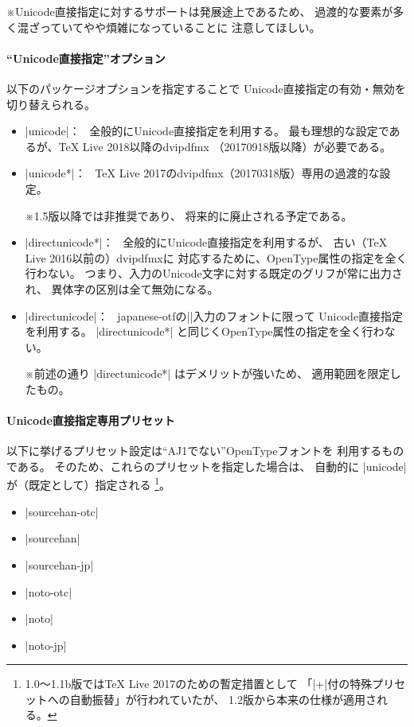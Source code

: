 \documentclass[uplatex,dvipdfmx,a4paper]{jsarticle}
\newcommand{\Pkg}[1]{\textsf{#1}}
\newcommand{\Note}{\par\noindent ※}
\newcommand{\Means}{：\ }
\providecommand{\Strong}[1]{\textsf{#1}}
\begin{document}
\Note Unicode直接指定に対するサポートは発展途上であるため、
過渡的な要素が多く混ざっていてやや煩雑になっていることに
注意してほしい。

\paragraph{“Unicode直接指定”オプション}
以下のパッケージオプションを指定することで
Unicode直接指定の有効・無効を切り替えられる。

\begin{itemize}
\item |unicode|\Means
  全般的にUnicode直接指定を利用する。
  最も理想的な設定であるが、\Strong{{\TeX} Live 2018以降のdvipdfmx}%
  （20170918版以降）が必要である。
\item |unicode*|\Means
  {\TeX} Live 2017のdvipdfmx（20170318版）専用の\Strong{過渡的}な設定。
  \Note 1.5版以降では\Strong{非推奨}であり、
  将来的に廃止される予定である。
\item |directunicode*|\Means
  全般的にUnicode直接指定を利用するが、
  古い（{\TeX} Live 2016以前の）dvipdfmxに
  対応するために、OpenType属性の指定を全く行わない。
  つまり、入力のUnicode文字に対する既定のグリフが常に出力され、
  異体字の区別は全て無効になる。
\item |directunicode|\Means
  \Pkg{japanese-otf}の|\UTF|入力のフォントに限って
  Unicode直接指定を利用する。
  |directunicode*| と同じくOpenType属性の指定を全く行わない。
  \Note 前述の通り |directunicode*| はデメリットが強いため、
  適用範囲を限定したもの。
\end{itemize}

\paragraph{Unicode直接指定専用プリセット}

以下に挙げるプリセット設定は“AJ1でない”OpenTypeフォントを
利用するものである。
そのため、これらのプリセットを指定した場合は、
自動的に |unicode| が（既定として）指定される%
\footnote{1.0～1.1b版では{\TeX} Live 2017のための暫定措置として
「|+|付の特殊プリセットへの自動振替」が行われていたが、
1.2版から本来の仕様が適用される。}。

\begin{itemize}
\item |sourcehan-otc|
\item |sourcehan|
\item |sourcehan-jp|
\item |noto-otc|
\item |noto|
\item |noto-jp|
\end{itemize}
\end{document}

